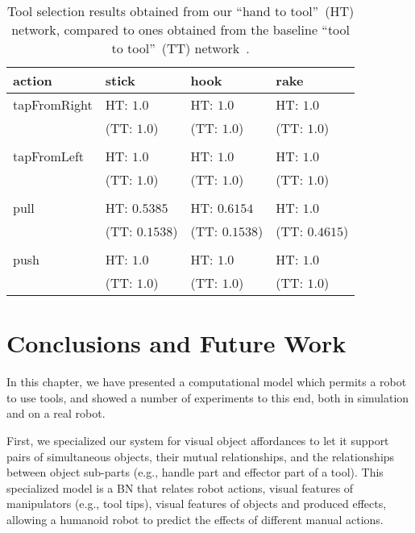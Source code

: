 \begin{table}
    \centering
    \caption[Tool selection results obtained from our ``hand to tool''~(HT) network.]{Tool selection results obtained from our ``hand to tool''~(HT) network, compared to ones obtained from the baseline ``tool to tool''~(TT) network~\cite{dehban:2016:eccvws}.}
    \label{tab:tool:tool_selection_results}
    \begin{tabular}{*{4}{l}} %
    \toprule
    action       & stick             & hook           & rake \\
    \midrule
    tapFromRight & HT: $1.0$         & HT: $1.0$         & HT: $1.0$ \\
                 & (TT: $1.0$)       & (TT: $1.0$)       & (TT: $1.0$) \\
                 &                   &                   & \\
    tapFromLeft  & HT: $1.0$         & HT: $1.0$         & HT: $1.0$ \\
                 & (TT: $1.0$)       & (TT: $1.0$)       & (TT: $1.0$) \\
                 &                   &                   & \\
    pull         & HT: $\bm{0.5385}$ & HT: $\bm{0.6154}$ & HT: $\bm{1.0}$ \\
                 & (TT: $0.1538$)    & (TT: $0.1538$)    & (TT: $0.4615$) \\
                 &                   &                   & \\
    push         & HT: $1.0$         & HT: $1.0$         & HT: $1.0$ \\
                 & (TT: $1.0$)       & (TT: $1.0$)       & (TT: $1.0$) \\
    \bottomrule
    \end{tabular}
\end{table}

\section{Conclusions and Future Work}
\label{sec:tool:conclusions}

In this chapter, we have presented a computational model which permits a robot to use tools, and showed a number of experiments to this end, both in simulation and on a real robot.

First, we specialized our system for visual object affordances to let it support pairs of simultaneous objects, their mutual relationships, and the relationships between object sub-parts (e.g., handle part and effector part of a tool).
This specialized model is a \ac{BN} that relates robot actions, visual features of manipulators (e.g., tool tips), visual features of objects and produced effects, allowing a humanoid robot to predict the effects of different manual actions.

